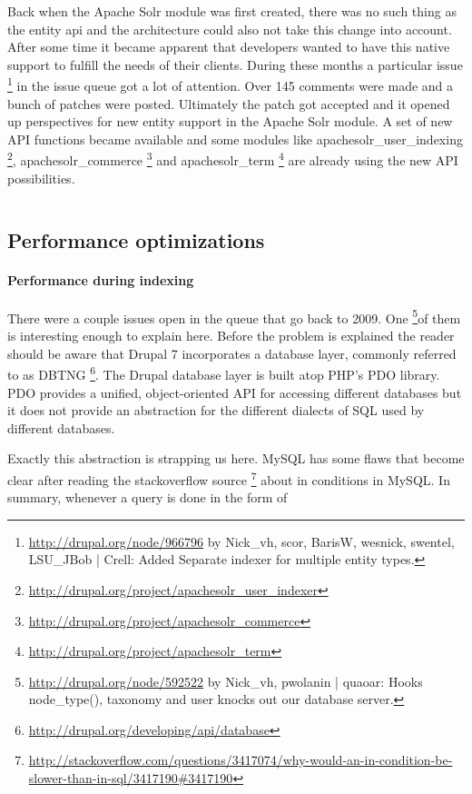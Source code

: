 Back when the Apache Solr module was first created, there was no such thing as the entity api and the architecture could also not take this change into account. After some time it became apparent that developers wanted to have this native support to fulfill the needs of their clients. During these months a particular issue \footnote{\url{http://drupal.org/node/966796}  by Nick\_vh, scor, BarisW, wesnick, swentel, LSU\_JBob | Crell: Added Separate indexer for multiple entity types.} in the issue queue got a lot of attention. Over 145 comments were made and a bunch of patches were posted. Ultimately the patch got accepted and it opened up perspectives for new entity support in the Apache Solr module. A set of new API functions became available and some modules like apachesolr\_user\_indexing \footnote{\url{http://drupal.org/project/apachesolr_user_indexer}}, apachesolr\_commerce \footnote{\url{http://drupal.org/project/apachesolr_commerce}} and apachesolr\_term \footnote{\url{http://drupal.org/project/apachesolr_term}} are already using the new API possibilities.

\inputminted[fontsize=\scriptsize,linenos]{php}{./code_examples/entity_api.php}

\subsection{Performance optimizations}
\paragraph{Performance during indexing}
There were a couple issues open in the queue that go back to 2009. One \footnote{\url{http://drupal.org/node/592522} by Nick\_vh, pwolanin | quaoar: Hooks node\_type(), taxonomy and user knocks out our database server.}of them is interesting enough to explain here. Before the problem is explained the reader should be aware that Drupal 7 incorporates a database layer, commonly referred to as DBTNG \footnote{\url{http://drupal.org/developing/api/database}}. The Drupal database layer is built atop PHP's PDO library. PDO provides a unified, object-oriented API for accessing different databases but it does not provide an abstraction for the different dialects of SQL used by different databases.

Exactly this abstraction is strapping us here. MySQL has some flaws that become clear after reading the stackoverflow source \footnote{\url{http://stackoverflow.com/questions/3417074/why-would-an-in-condition-be-slower-than-in-sql/3417190\#3417190}} about in conditions in MySQL. In summary, whenever a query is done in the form of 

